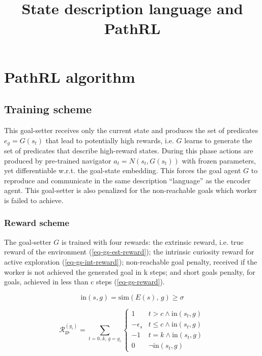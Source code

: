 \documentclass[acmsmall, nonacm]{acmart}
\title{State description language and PathRL}
\begin{document}
\maketitle

\section{PathRL algorithm}

\subsection{Training scheme}

This goal-setter receives only the current state and produces the set of predicates $e_g = G(s_t)$ that lead to potentially high rewards, i.e. $G$ learns to generate the set of predicates that describe high-reward states. During this phase actions are produced by pre-trained navigator $a_t = N(s_t, G(s_t))$ with frozen parameters, yet differentiable w.r.t. the goal-state embedding. This forces the goal agent $G$ to reproduce and communicate in the same description ``language'' as the encoder agent. This goal-setter is also penalized for the non-reachable goals which worker is failed to achieve.

\subsubsection{Reward scheme}

The goal-setter $G$ is trained with four rewards: the extrinsic reward, i.e. true reward of the environment (\ref{eq-gs-est-reward}); the intrinsic curiosity reward for active exploration (\ref{eq-gs-int-reward}); non-reachable goal penalty, received if the worker is not achieved the generated goal in k steps; and short goals penalty, for goals, achieved in less than c steps (\ref{eq-gs-reward}).

\begin{equation}
\mathrm{in}(s, g) = \mathrm{sim}(E(s),\, g) \ge \sigma
\end{equation}

\begin{equation} \label{eq-gs-reward}
\mathcal{R}_\mathrm{gs}^{(g_i)} = \sum_{t=0..k,\, g=g_i}
\begin{cases}
1 & t > c \land \mathrm{in}(s_t, g) \\
-\epsilon_s & t \le c \land \mathrm{in}(s_t, g) \\
-1 & t=k \land \mathrm{in}(s_t, g) \\
0 & \lnot \mathrm{in}(s_t, g)
\end{cases}
\end{equation}
\end{document}

